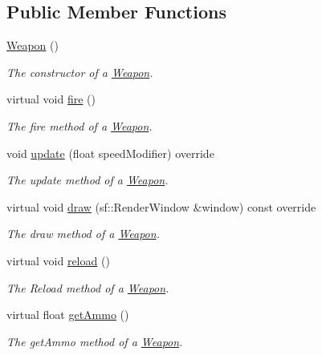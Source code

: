 \subsection*{Public Member Functions}
\begin{DoxyCompactItemize}
\item 
\hypertarget{class_weapon_a42dbc46dd70319a24763992c4ebbd396}{\hyperlink{class_weapon_a42dbc46dd70319a24763992c4ebbd396}{Weapon} ()}\label{class_weapon_a42dbc46dd70319a24763992c4ebbd396}

\begin{DoxyCompactList}\small\item\em The constructor of a \hyperlink{class_weapon}{Weapon}. \end{DoxyCompactList}\item 
virtual void \hyperlink{class_weapon_af6f8ab97e28fd4778f97c96c78fd02f4}{fire} ()
\begin{DoxyCompactList}\small\item\em The fire method of a \hyperlink{class_weapon}{Weapon}. \end{DoxyCompactList}\item 
void \hyperlink{class_weapon_a098b1074ff1099e9fbd83d1186b8f18f}{update} (float speed\+Modifier) override
\begin{DoxyCompactList}\small\item\em The update method of a \hyperlink{class_weapon}{Weapon}. \end{DoxyCompactList}\item 
virtual void \hyperlink{class_weapon_acb2e13733d27dec0a15845c359bf68a6}{draw} (sf\+::\+Render\+Window \&window) const override
\begin{DoxyCompactList}\small\item\em The draw method of a \hyperlink{class_weapon}{Weapon}. \end{DoxyCompactList}\item 
virtual void \hyperlink{class_weapon_ae02c48b932b0327382c5dd1672079590}{reload} ()
\begin{DoxyCompactList}\small\item\em The Reload method of a \hyperlink{class_weapon}{Weapon}. \end{DoxyCompactList}\item 
virtual float \hyperlink{class_weapon_a2286ebc74825dd4b03d9981eb968e602}{get\+Ammo} ()
\begin{DoxyCompactList}\small\item\em The get\+Ammo method of a \hyperlink{class_weapon}{Weapon}. \end{DoxyCompactList}\item 

\end{DoxyCompactItemize}
